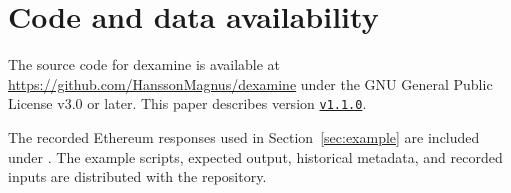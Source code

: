 \documentclass[11pt]{article}
\begin{document}
\section*{Code and data availability}
The source code for dexamine is available at
\url{https://github.com/HanssonMagnus/dexamine} under the GNU General Public License
v3.0 or later. This paper describes version
\href{https://github.com/HanssonMagnus/dexamine/tree/v1.1.0}{\texttt{v1.1.0}}.

The recorded Ethereum responses used in Section~\ref{sec:example} are included
under . The example scripts, expected output, historical
metadata, and recorded inputs are distributed with the repository.



\end{document}
